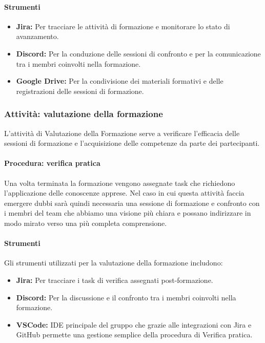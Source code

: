 \documentclass[a4paper,12pt]{article}
\begin{document}
\paragraph{Strumenti}
\begin{itemize}
    \item \textbf{Jira:} Per tracciare le attività di formazione e monitorare lo stato di avanzamento.
    \item \textbf{Discord:} Per la conduzione delle sessioni di confronto e per la comunicazione tra i membri coinvolti nella formazione.
    \item \textbf{Google Drive:} Per la condivisione dei materiali formativi e delle registrazioni delle sessioni di formazione.
\end{itemize}

\subsubsection{Attività: valutazione della formazione}
L'attività di Valutazione della Formazione serve a verificare l'efficacia delle
sessioni di formazione e l'acquisizione delle competenze da parte dei
partecipanti.
\paragraph{Procedura: verifica pratica}
Una volta terminata la formazione vengono assegnate
task che richiedono l'applicazione delle conoscenze apprese. Nel caso in cui
questa attività faccia emergere dubbi sarà quindi necessaria una sessione di
formazione e confronto con i membri del team che abbiamo una visione più chiara
e possano indirizzare in modo mirato verso una più completa comprensione.

\paragraph{Strumenti}
Gli strumenti utilizzati per la valutazione della formazione includono:
\begin{itemize}
    \item \textbf{Jira:} Per tracciare i task di verifica assegnati post-formazione.
    \item \textbf{Discord:} Per la discussione e il confronto tra i membri coinvolti nella formazione.
    \item \textbf{VSCode:} IDE principale del gruppo che grazie alle integrazioni con Jira e GitHub permette una gestione semplice della procedura di Verifica pratica.
\end{itemize}
\end{document}
